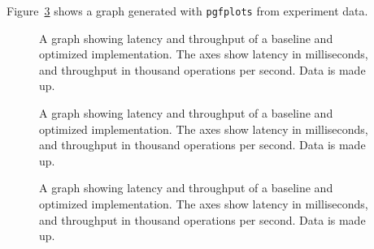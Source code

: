 Figure~\ref{fig:graph} shows a graph generated with \texttt{pgfplots} from 
experiment data.
\begin{figure}
\caption{A graph showing latency and throughput of a baseline and optimized implementation. The axes show latency in milliseconds, and throughput in thousand operations per second. Data is made up.}
\label{fig:graph}
\end{figure}

\begin{figure}
    \caption{A graph showing latency and throughput of a baseline and optimized implementation. The axes show latency in milliseconds, and throughput in thousand operations per second. Data is made up.}
    \label{fig:graph}
    \end{figure}

    \begin{figure}
        \caption{A graph showing latency and throughput of a baseline and optimized implementation. The axes show latency in milliseconds, and throughput in thousand operations per second. Data is made up.}
        \label{fig:graph}
        \end{figure}
        
    
